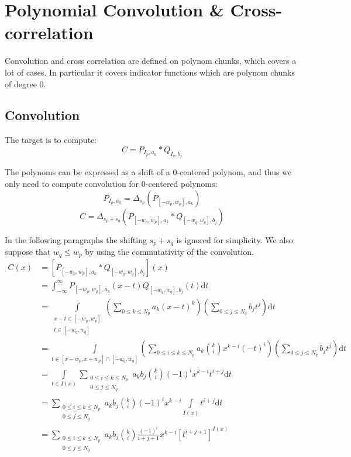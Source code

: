 \documentclass[a4paper,10pt]{article}
\newcommand\Shifted[2]{\Delta_{#1}(#2)}
\newcommand\D{\mathrm{d}}
\newcommand\Convolution{\ast}
\newcommand\IntR[2]{\int_{-\infty}^{\infty}#1 \D#2}
\begin{document}
\section{Polynomial Convolution \& Cross-correlation}

Convolution and cross correlation are defined on polynom chunks, which covers a lot of cases.
In particular it covers indicator functions which are polynom chunks of degree $0$.

\subsection{Convolution}

The target is to compute:
\[ C = P_{I_p,a_k} \Convolution Q_{I_q,b_j} \]

The polynoms can be expressed as a shift of a 0-centered polynom, and thus we only need to compute convolution for 0-centered polynoms:
\[ P_{I_p,a_k} = \Shifted{s_p}{P_{[-w_p,w_p],a_k}} \]
\[ C = \Shifted{s_p + s_q}{P_{[-w_p,w_p],a_k} \Convolution Q_{[-w_q,w_q],b_j}} \]

In the following paragraphs the shifting $s_p + s_q$ is ignored for simplicity.
We also suppose that $w_q \le w_p$ by using the commutativity of the convolution.
\[ \begin{split}
    C(x)
    &= \left[ P_{[-w_p,w_p],a_k} \Convolution Q_{[-w_q,w_q],b_j} \right](x) \\
    &= \IntR{ P_{[-w_p,w_p],a_k}(x-t) Q_{[-w_q,w_q],b_j}(t)}{t} \\
    &= \int\limits_{\substack{x - t \in [-w_p,w_p] \\ t \in [-w_q,w_q]}} \left( \sum_{0 \le k \le N_p} a_k (x-t)^k \right) \left( \sum_{0 \le j \le N_q} b_j t^j \right) \D t \\
    &= \int\limits_{t \in [x-w_p,x+w_p] \cap [-w_q,w_q]} \left( \sum_{0 \le i \le k \le N_p} a_k \binom{k}{i} x^{k-i} (-t)^i \right) \left( \sum_{0 \le j \le N_q} b_j t^j \right) \D t \\
    &= \int\limits_{t \in I(x)} \sum_{\substack{0 \le i \le k \le N_p \\ 0 \le j \le N_q}} a_k b_j \binom{k}{i} (-1)^i x^{k-i} t^{i+j} \D t \\
    &= \sum_{\substack{0 \le i \le k \le N_p \\ 0 \le j \le N_q}} a_k b_j \binom{k}{i} (-1)^i x^{k-i} \int\limits_{I(x)} t^{i+j} \D t \\
    &= \sum_{\substack{0 \le i \le k \le N_p \\ 0 \le j \le N_q}} a_k b_j \binom{k}{i} \frac{(-1)^i}{i+j+1} x^{k-i} \left[ t^{i+j+1} \right]^{I(x)} 
\end{split} \]
\end{document}
